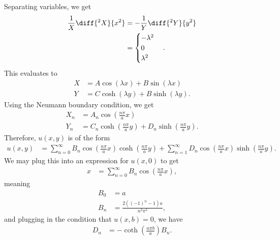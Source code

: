 \documentclass[10pt]{mypackage}
\begin{document}
\begin{solution}[12.5, Problem 4]
  Separating variables, we get
  \begin{align*}
    \frac{1}{X}\diff{^2X}{x^2} &= -\frac{1}{Y}\diff{^2Y}{y^2}\\
                               &= \begin{cases}
                                 -\lambda^2\\
                                 0\\
                                 \lambda^2
                               \end{cases}.
  \end{align*}
  This evaluates to
  \begin{align*}
    X &= A\cos\left( \lambda x \right) + B\sin\left( \lambda x \right)\\
    Y &= C\cosh\left( \lambda y \right) + B\sinh\left( \lambda y \right).
  \end{align*}
  Using the Neumann boundary condition, we get
  \begin{align*}
    X_n &= A_n\cos\left( \frac{n\pi}{a}x \right)\\
    Y_n &= C_n\cosh\left( \frac{n\pi}{a}y \right) + D_n\sinh\left( \frac{n\pi}{a}y \right).
  \end{align*}
  Therefore, $u\left( x,y \right)$ is of the form
  \begin{align*}
    u\left( x,y \right) &= \sum_{n=0}^{\infty}B_n\cos\left( \frac{n\pi}{a}x \right)\cosh\left( \frac{n\pi}{a}y \right) + \sum_{n=1}^{\infty}D_n\cos\left( \frac{n\pi}{a}x \right)\sinh\left( \frac{n\pi}{a}y \right).
  \end{align*}
  We may plug this into an expression for $u\left( x,0 \right)$ to get
  \begin{align*}
    x &= \sum_{n=0}^{\infty}B_n\cos\left( \frac{n\pi}{a}x \right),
  \end{align*}
  meaning
  \begin{align*}
    B_0 &= a\\
    B_n &= \frac{2\left( \left( -1 \right)^{n} -1 \right)a}{n^2\pi^2},
  \end{align*}
  and plugging in the condition that $u\left( x,b \right) = 0$, we have
  \begin{align*}
    D_n &= -\coth\left( \frac{n\pi b}{a} \right)B_n.
  \end{align*}
\end{solution}
\end{document}
